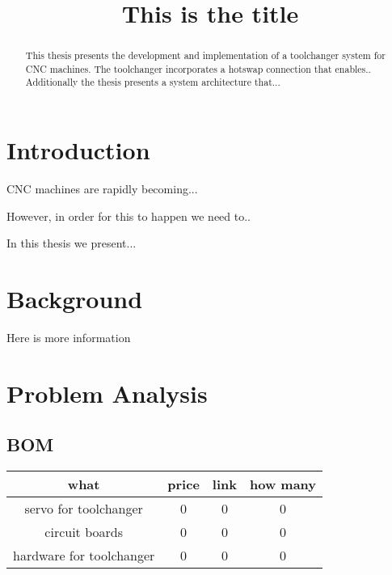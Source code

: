 \documentclass[a4paper]{article}
\begin{document}
\title{This is the title}

\maketitle

\begin{abstract}
    This thesis presents the development and implementation of a toolchanger system for CNC machines. The toolchanger incorporates a hotswap connection that enables.. Additionally the thesis presents a system architecture that... 
\end{abstract}

\section{Introduction}
CNC machines are rapidly becoming... 

However, in order for this to happen we need to.. 

In this thesis we present... 


\section{Background}

Here is more information

\section{Problem Analysis}

\subsection*{BOM}

\begin{center}
    \begin{tabular}{ c c c c }
     what & price & link &  how many\\ 
     \hline
     servo for toolchanger & 0 & 0 & 0 \\  
     circuit boards & 0 & 0 & 0   \\
     hardware for toolchanger & 0 & 0 & 0 \\
    \end{tabular}
    \end{center}
\end{document}
